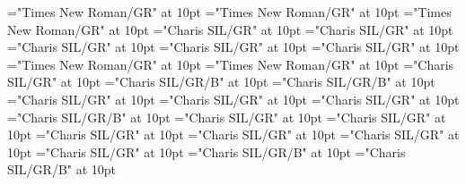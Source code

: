 \documentclass[a4paper,twoside]{article}
\begin{document}
\font\translationLcpttranslationsexamplessensesensesentryletDatadicBody="Times New Roman/GR" at 10pt
\font\xitempttranslationLcpttranslationsexamplessensesensesentryletDatadicBody="Times New Roman/GR" at 10pt
\font\spanptxitempttranslationLcpttranslationsexamplessensesensesentryletDatadicBody="Times New Roman/GR" at 10pt
\font\spanentranslationLcpttranslationsexamplessensesensesentryletDatadicBody="Charis SIL/GR" at 10pt
\font\xitementranslationLcpttranslationsexamplessensesensesentryletDatadicBody="Charis SIL/GR" at 10pt
\font\spanenxitementranslationLcpttranslationsexamplessensesensesentryletDatadicBody="Charis SIL/GR" at 10pt
\font\complexformrefsentryletDatadicBody="Charis SIL/GR" at 10pt
\font\complexformtypecomplexformrefsentryletDatadicBody="Charis SIL/GR" at 10pt
\font\LexEntryTypepublishStemComplexFormTypeReverseAbbrPubptcomplexformtypecomplexformrefsentryletDatadicBody="Times New Roman/GR" at 10pt
\font\spanptLexEntryTypepublishStemComplexFormTypeReverseAbbrPubptcomplexformtypecomplexformrefsentryletDatadicBody="Times New Roman/GR" at 10pt
\font\spanencomplexformtypecomplexformrefsentryletDatadicBody="Charis SIL/GR" at 10pt
\font\complexformformsehcomplexformrefsentryletDatadicBody="Charis SIL/GR/B" at 10pt
\font\spanencomplexformformsehcomplexformrefsentryletDatadicBody="Charis SIL/GR/B" at 10pt
\font\spanencomplexformrefsentryletDatadicBody="Charis SIL/GR" at 10pt
\font\xitementryrefcomponentprimaryrefsentryletDatadicBody="Charis SIL/GR" at 10pt
\font\axitementryrefcomponentprimaryrefsentryletDatadicBody="Charis SIL/GR" at 10pt
\font\LexEntrypublishStemComponentTargetHeadWordRefsehaxitementryrefcomponentprimaryrefsentryletDatadicBody="Charis SIL/GR/B" at 10pt
\font\spanenentryrefcomponentprimaryrefsentryletDatadicBody="Charis SIL/GR" at 10pt
\font\translationLcentranslationsexamplessensesensesentryletDatadicBody="Charis SIL/GR" at 10pt
\font\spanentranslationLcentranslationsexamplessensesensesentryletDatadicBody="Charis SIL/GR" at 10pt
\font\xitemrelationssensesensesentryletDatadicBody="Charis SIL/GR" at 10pt
\font\lexreftargetsxitemrelationssensesensesentryletDatadicBody="Charis SIL/GR" at 10pt
\font\alexreftargetsxitemrelationssensesensesentryletDatadicBody="Charis SIL/GR" at 10pt
\font\sensecrossrefsehalexreftargetsxitemrelationssensesensesentryletDatadicBody="Charis SIL/GR/B" at 10pt
\font\xsensexrefnumbersensecrossrefsehalexreftargetsxitemrelationssensesensesentryletDatadicBody="Charis SIL/GR/B" at 10pt
\color{black} 
\end{document}
